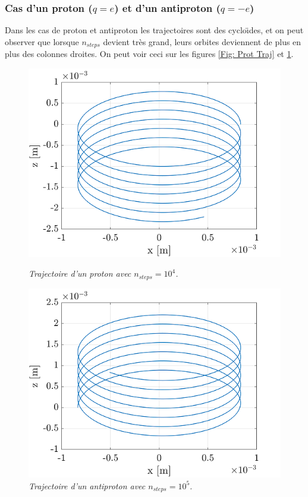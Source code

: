 \documentclass[a4paper,12pt,twoside]{article}
\begin{document}
\subsubsection{Cas d'un proton ($q = e$) et d'un antiproton ($q = -e$)}
Dans les cas de proton et antiproton les trajectoires sont des cyclo\"\i des, et on peut observer que lorsque $n_{steps}$ devient tr\`es grand, leurs orbites deviennent de plus en plus des colonnes droites. On peut voir ceci sur les figures \ref{Fig: Prot Traj} et \ref{Fig: Anti Traj}.
\begin{figure}[h]
				\begin{minipage}[c]{.46\linewidth}
					\centering
					\includegraphics[scale = 0.6]{final_traj_prot.png}
					\caption{\em\label{Fig: Prot Traj} Trajectoire d'un proton avec $n_{steps} = 10^4$.}
				\end{minipage}
				\hfill%
				\begin{minipage}[c]{.46\linewidth}
					\centering
					\includegraphics[scale = 0.6]{final_traj_antiprot.png}
					\caption{\em\label{Fig: Anti Traj} Trajectoire d'un antiproton avec $n_{steps} = 10^5$.}
				\end{minipage}
			\end{figure}
\end{document}

